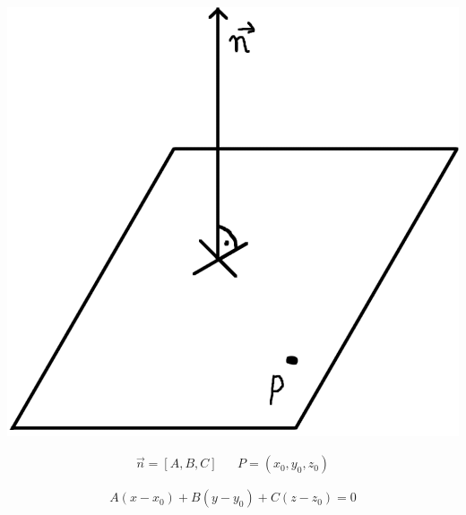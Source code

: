 \documentclass[11pt]{article}
\begin{document}
\begin{center}
\includegraphics[width=.9\linewidth]{figures/plaszczyzna.png}
\end{center}

\begin{latex}
\begin{align*}
\vec{n}=[A,B,C] && P=(x_{0}, y_{0}, z_{0})
\end{align*}
\end{latex}

$$A(x - x_{0}) + B(y-y_{0}) + C(z - z_{0}) = 0$$
\end{document}
